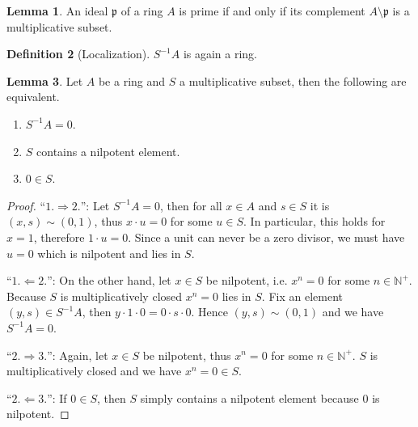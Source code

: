 \documentclass[a4paper]{book}
\theoremstyle{definition}
\newtheorem{definition}{Definition}[]
\newtheorem{lemma}[definition]{Lemma}
\begin{document}
\begin{thmbox}
    \begin{lemma}
        An ideal \(\mathfrak{p}\) of a ring \(A\) is prime if and only if its complement \(A \setminus \mathfrak{p}\) is a multiplicative subset.
    \end{lemma}
\end{thmbox}

\begin{defbox}
    \begin{definition}[Localization]
        \(S^{-1}A\) is again a ring.
    \end{definition}
\end{defbox}

\begin{thmbox}
    \begin{lemma}
        Let \(A\) be a ring and \(S\) a multiplicative subset, then the following are equivalent.
        \begin{enumerate}
            \item \(S^{-1}A = 0\).
            \item \(S\) contains a nilpotent element.
            \item \(0 \in S\).
        \end{enumerate}
    \end{lemma}
\end{thmbox}
\begin{proof}
    ``\(1. \Rightarrow 2.\)'': Let \(S^{-1}A = 0\), then for all \(x \in A\) and \(s \in S\) it is \((x, s) \sim (0, 1)\), thus \(x \cdot u = 0\) for some \(u \in S\). In particular, this holds for \(x = 1\), therefore \(1 \cdot u = 0\). Since a unit can never be a zero divisor, we must have \(u = 0\) which is nilpotent and lies in \(S\).

    ``\(1. \Leftarrow 2.\)'': On the other hand, let \(x \in S\) be nilpotent, i.e. \(x^n = 0\) for some \(n \in \mathbb{N}^+\). Because \(S\) is multiplicatively closed \(x^n = 0\) lies in \(S\). Fix an element \((y, s) \in S^{-1}A\), then \(y \cdot 1 \cdot 0 = 0 \cdot s \cdot 0\). Hence \((y, s) \sim (0, 1)\) and we have \(S^{-1}A = 0\).

    ``\(2. \Rightarrow 3.\)'': Again, let \(x \in S\) be nilpotent, thus \(x^n = 0\) for some \(n \in \mathbb{N}^+\). \(S\) is multiplicatively closed and we have \(x^n = 0 \in S\).

    ``\(2. \Leftarrow 3.\)'': If \(0 \in S\), then \(S\) simply contains a nilpotent element because \(0\) is nilpotent.
\end{proof}
\end{document}
